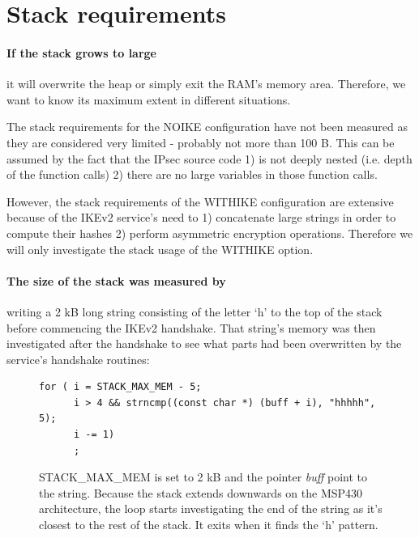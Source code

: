 \documentclass[final,a4paper,twoside,11pt,onecolumn]{report}
\begin{document}

\section{Stack requirements}
\paragraph{If the stack grows to large} it will overwrite the heap or simply exit the RAM's memory area. Therefore, we want to know its maximum extent in different situations.

The stack requirements for the NOIKE configuration have not been measured as they are considered very limited - probably not more than 100 B. This can be assumed by the fact that the IPsec source code 1) is not deeply nested (i.e. depth of the function calls) 2) there are no large variables in those function calls. 


However, the stack requirements of the WITHIKE configuration are extensive because of the IKEv2 service's need to 1) concatenate large strings in order to compute their hashes 2) perform asymmetric encryption operations. Therefore we will only investigate the stack usage of the WITHIKE option.

\paragraph{The size of the stack was measured by} writing a 2 kB long string consisting of the letter `h' to the top of the stack before commencing the IKEv2 handshake. That string's memory was then investigated after the handshake to see what parts had been overwritten by the service's handshake routines:

\begin{figure}[h]
\centering
\begin{verbatim}
for ( i = STACK_MAX_MEM - 5;
      i > 4 && strncmp((const char *) (buff + i), "hhhhh", 5);
      i -= 1)
      ;
\end{verbatim}
\label{code:stack}
\caption{STACK\_MAX\_MEM is set to 2 kB and the pointer \emph{buff} point to the string. Because the stack extends downwards on the MSP430 architecture, the loop starts investigating the end of the string as it's closest to the rest of the stack. It exits when it finds the `h' pattern.}
\end{figure}
\end{document}
